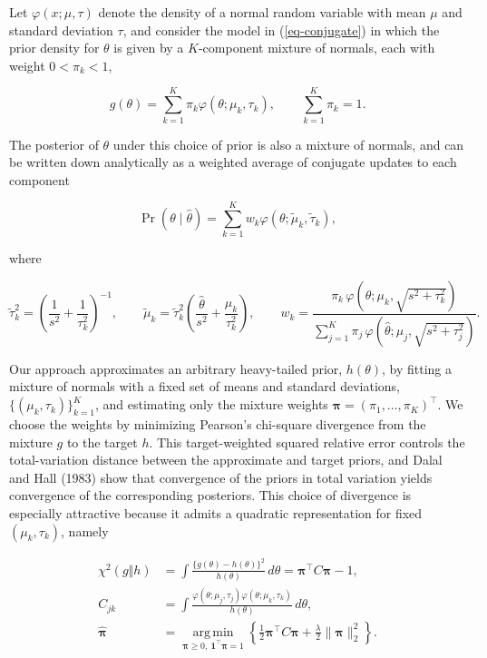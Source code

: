 \documentclass[11pt,letterpaper]{article}
\begin{document}
Let $\varphi(x; \mu, \tau)$ denote the density of a normal random variable
with mean $\mu$ and standard deviation $\tau$, and consider the model in
(\ref{eq-conjugate}) in which the prior density for $\theta$ is given by a
$K$-component mixture of normals, each with weight $0 < \pi_k < 1$, 

$$
g(\theta) = \sum_{k=1}^K \pi_k \varphi(\theta;\mu_k,\tau_k),
\qquad
\sum_{k=1}^K \pi_k = 1.
$$

The posterior of $\theta$ under this choice of prior is also a mixture of
normals, and can be written down analytically as a weighted
average of conjugate updates to each component

$$
\Pr(\theta \mid \hat\theta)
=
\sum_{k=1}^K w_k \varphi(\theta;\tilde\mu_k,\tilde\tau_k),
$$

where

$$
\tilde\tau_k^2 = \left(\frac{1}{s^2} + \frac{1}{\tau_k^2}\right)^{-1}, \qquad
\tilde\mu_k = \tilde\tau_k^2 \left(\frac{\hat\theta}{s^2} + \frac{\mu_k}{\tau_k^2}\right), \qquad
w_k =
\frac{\pi_k\,\varphi\!\left(\hat\theta; \mu_k, \sqrt{s^2+\tau_k^2}\right)}
{\sum_{j=1}^K \pi_j\,\varphi\!\left(\hat\theta; \mu_j, \sqrt{s^2+\tau_j^2}\right)}.
$$

Our approach approximates an arbitrary heavy-tailed prior, $h(\theta)$, by fitting a
mixture of normals with a fixed set of means and standard deviations,
$\{(\mu_k,\tau_k)\}_{k=1}^K$, and estimating only the mixture weights
$\boldsymbol{\pi}=(\pi_1,\ldots,\pi_K)^\top$. We choose the weights by
minimizing Pearson's chi-square divergence from the mixture $g$ to the
target $h$. This target-weighted squared relative error controls the total-variation distance between the approximate and target priors, and Dalal and Hall (1983) show that convergence of the priors in total variation yields convergence of the corresponding posteriors. This choice of divergence is especially
attractive because it admits a quadratic representation for fixed $(\mu_k,\tau_k)$, 
namely

$$
\begin{aligned}
\chi^2(g\Vert h)
&=
\int
\frac{\{g(\theta)-h(\theta)\}^2}{h(\theta)}\,d\theta
=\boldsymbol{\pi}^{\top}C\boldsymbol{\pi}-1,\\
C_{jk}
&=
\int
\frac{\varphi(\theta;\mu_j,\tau_j)\varphi(\theta;\mu_k,\tau_k)}
{h(\theta)}\,d\theta,\\
\widehat{\boldsymbol{\pi}}
&=
\underset{\boldsymbol{\pi}\geq0,\ \mathbf{1}^{\top}\boldsymbol{\pi}=1}
{\operatorname{arg\,min}}
\left\{
\frac{1}{2}\boldsymbol{\pi}^{\top}C\boldsymbol{\pi}
+\frac{\lambda}{2}\lVert\boldsymbol{\pi}\rVert_2^2
\right\}.
\end{aligned}
$$
\end{document}
